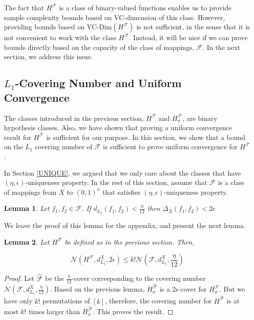 \documentclass[letterpaper,12pt,titlepage,oneside,final]{book}
\newtheorem{lemma}{Lemma}
\begin{document}
The fact that  $H^{\mathcal{F}}$ is a class of binary-valued functions enables us to provide sample complexity bounds based on VC-dimension of this class. However, providing bounds based on VC-Dim$(H^{\mathcal{F}})$ is not sufficient, in the sense that it is not convenient to work with the class $H^{\mathcal{F}}$. Instead, it will be nice if we can prove bounds directly based on the capacity of the class of mappings, $\mathcal{F}$. In the next section, we address this issue.

\subsection{$L_1$-Covering Number and Uniform Convergence}

The classes introduced in the previous section, $H^{\mathcal{F}}$ and $H^{\mathcal{F}}_\sigma$, are binary hypothesis classes. Also, we have shown that proving a uniform convergence result for $H^{\mathcal{F}}$ is sufficient for our purpose. In this section, we show that a bound on the $L_1$ covering number of $\mathcal{F}$ is sufficient to prove uniform convergence for $H^{\mathcal{F}}$.

In Section \ref{UNIQUE}, we argued that we only care about the classes that have $(\eta, \epsilon)$-uniqueness property. In the rest of this section, assume that $\mathcal{F}$ is a class of mappings from $X$ to $(0,1)^n$ that satisfies $(\eta, \epsilon)$-uniqueness property.

\begin{lemma}
\label{lemma1}
Let $f_1,f_2\in \mathcal{F}$. If $d_{L_1}(f_1,f_2) < \frac{\eta}{12}$ then $\Delta_X(f_1, f_2) < 2\epsilon$
\end{lemma}

We leave the proof of this lemma for the appendix, and present the next lemma.

\begin{lemma}
\label{COVERLEMMA}
Let $H^{\mathcal{F}}$ be defined as in the previous section. Then,

\begin{equation}
\mathcal{N}(H^{\mathcal{F}}, d_{L_1}^{X}, 2\epsilon) \leq k!\mathcal{N}(\mathcal{F}, d_{L_1}^{X}, \frac{\eta}{12})
\end{equation}
\end{lemma}

\begin{proof}
Let $\hat{\mathcal{F}}$ be the $\frac{\eta}{12}$-cover corresponding to the covering number $\mathcal{N}(\mathcal{F}, d_{L_1}^{X}, \frac{\eta}{12})$. Based on the previous lemma, $H^{\hat{\mathcal{F}}}_\sigma$ is a $2\epsilon$-cover for $H^{{\mathcal{F}}}_\sigma$. But we have only $k!$ permutations of $[k]$, therefore, the covering number for $H^{\hat{\mathcal{F}}}$ is at most $k!$ times larger than $H^{\hat{\mathcal{F}}}_\sigma$. This proves the result.
\end{proof}
\end{document}
